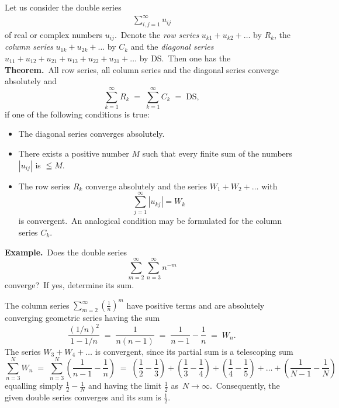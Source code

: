 \documentclass[12pt]{article}
\theoremstyle{definition}
\begin{document}
Let us consider the double series
\begin{align}
\sum_{i,j=1}^\infty u_{ij}
\end{align}
of real or complex numbers $u_{ij}$.\, Denote the {\em row series} $u_{k1}\!+\!u_{k2}\!+\ldots$ by $R_k$, the {\em column series} $u_{1k}\!+\!u_{2k}\!+\ldots$ by $C_k$ and the {\em diagonal series} $u_{11}\!+\!u_{12}\!+\!u_{21}\!+\!u_{13}\!+\!u_{22}\!+\!u_{31}\!+\ldots$
by DS.\, Then one has the\\


\textbf{Theorem.}\, All row series, all column series and the diagonal series converge absolutely and
\[
\sum_{k=1}^\infty R_k \;=\; \sum_{k=1}^\infty C_k \;=\; \mbox{DS},
\]
if one of the following conditions is true:
\begin{itemize}
\item The diagonal series converges absolutely. 
\item There exists a positive number $M$ such that every finite sum of the numbers $|u_{ij}|$ is $\leqq M$.
\item The row series $R_k$ converge absolutely and the series $W_1\!+\!W_2\!+\ldots$ with  
\[
\sum_{j=1}^\infty|u_{kj}| = W_k
\]
is convergent.\, An analogical condition may be formulated for the column series $C_k$.
\end{itemize}


\textbf{Example.}\, Does the double series
\[
\sum_{m=2}^\infty\sum_{n=3}^\infty n^{-m}
\]
converge?\, If yes, determine its sum.

The column series $\displaystyle\sum_{m=2}^\infty\left(\frac{1}{n}\right)^m$ have positive terms and are absolutely converging geometric series having the sum
\[
\frac{(1/n)^2}{1-1/n} \;=\; \frac{1}{n(n\!-\!1)} \;=\; \frac{1}{n\!-\!1}-\frac{1}{n} \;=\; W_n.
\]
The series $W_3\!+\!W_4\!+\ldots$ is convergent, since its partial sum is a telescoping sum
\[
\sum_{n=3}^N W_n \;=\; \sum_{n=3}^N\left(\frac{1}{n\!-\!1}-\frac{1}{n}\right) \;=\;
\left(\frac{1}{2}-\frac{1}{3}\right)+\left(\frac{1}{3}-\frac{1}{4}\right)+\left(\frac{1}{4}-\frac{1}{5}\right)
+\ldots+\left(\frac{1}{N\!-\!1}-\frac{1}{N}\right)
\]
equalling simply $\frac{1}{2}\!-\!\frac{1}{N}$ and having the limit $\frac{1}{2}$ as\, $N \to \infty$.\, Consequently, the given double series converges and its sum is $\frac{1}{2}$.



\end{document}
